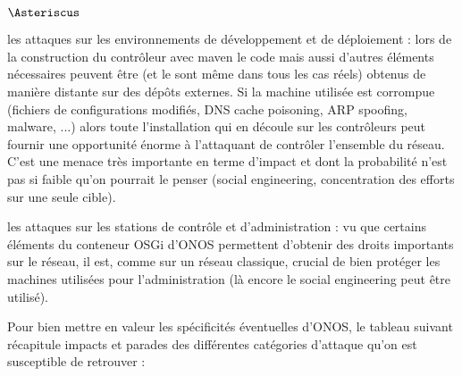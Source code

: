 \begin{list}{$\Asteriscus$}{}
\item les attaques sur les environnements de développement et de déploiement : lors de la construction du contrôleur avec maven le code mais aussi d'autres éléments nécessaires peuvent être (et le sont même dans tous les cas réels) obtenus de manière distante sur des dépôts externes. Si la machine utilisée est corrompue (fichiers de configurations modifiés, DNS cache poisoning, ARP spoofing, malware, ...) alors toute l'installation qui en découle sur les contrôleurs peut fournir une opportunité énorme à l'attaquant de contrôler l'ensemble du réseau. C'est une menace très importante en terme d'impact et dont la probabilité n'est pas si faible qu'on pourrait le penser (social engineering, concentration des efforts sur une seule cible).

\item les attaques sur les stations de contrôle et d'administration : vu que certains éléments du conteneur OSGi d'ONOS permettent d'obtenir des droits importants sur le réseau, il est, comme sur un réseau classique, crucial de bien protéger les machines utilisées pour l'administration (là encore le social engineering peut être utilisé).

\end{list}

Pour bien mettre en valeur les spécificités éventuelles d'ONOS, le tableau suivant récapitule impacts et parades des différentes catégories d'attaque qu'on est susceptible de retrouver : \\~\\

